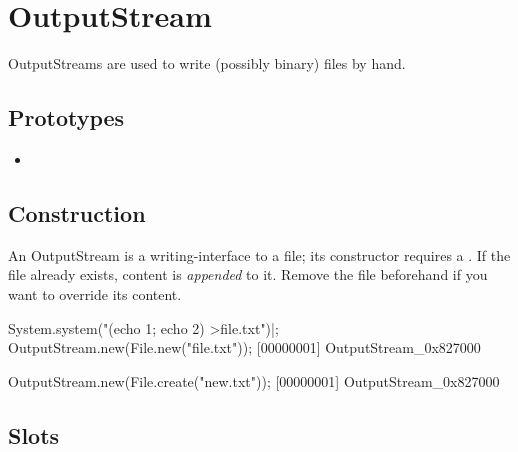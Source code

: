 \section{OutputStream}

OutputStreams are used to write (possibly binary) files by hand.

\subsection{Prototypes}
\begin{itemize}
\item {}
\end{itemize}

\subsection{Construction}

An OutputStream is a writing-interface to a file; its constructor
requires a .  If the file already exists, content is
\emph{appended} to it.  Remove the file beforehand if you want to
override its content.

\begin{urbiscript}
System.system("(echo 1; echo 2) >file.txt")|;
OutputStream.new(File.new("file.txt"));
[00000001] OutputStream_0x827000

OutputStream.new(File.create("new.txt"));
[00000001] OutputStream_0x827000
\end{urbiscript}

\subsection{Slots}

